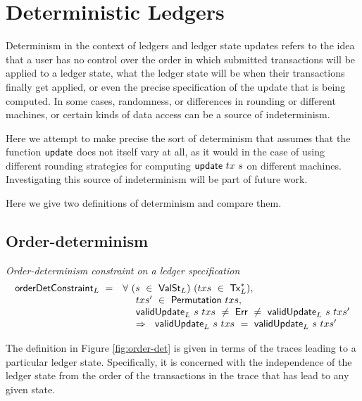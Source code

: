 \section{Deterministic Ledgers}
\label{sec:determinism}

Determinism in the context of ledgers and ledger state updates refers to the
idea that a user has no control over the order in which submitted transactions
will be applied to a ledger state, what the ledger state will be
when their transactions finally get applied, or even the precise specification
of the update that is being computed. In some cases, randomness,
or differences in rounding or different machines, or certain kinds of
data access can be a source of indeterminism.

Here we attempt to make precise the sort of determinism that assumes that the
function $\mathsf{update}$ does not itself vary at all, as it would in the case of using
different rounding strategies for computing $\mathsf{update}~tx~s$ on different machines.
Investigating this source of indeterminism will be part of future work.

Here we give two definitions of determinism and compare them.

\subsection{Order-determinism}
\label{sec:order-det}

\begin{figure*}[htb]
  \emph{Order-determinism constraint on a ledger specification}
  \begin{equation*}
    \begin{array}{l@{~~}l@{~~}ll}
    \fun{orderDetConstraint}_L ~=~ & \forall~(s~\in~\type{ValSt}_L)~(txs~\in~\seqof{\type{Tx}_L}),~\\
    & ~~~~txs'~\in~\fun{Permutation}~txs,~\\
    & ~~~~\fun{validUpdate}_L~s~txs~\neq~\Err~\neq~\fun{validUpdate}_L~s~txs' \\
    & ~~~~\Rightarrow~~\fun{validUpdate}_L~s~txs~=~\fun{validUpdate}_L~s~txs'
    \end{array}
  \end{equation*}
  \caption{Order-determinism}
  \label{fig:order-det}
\end{figure*}

The definition in Figure \ref{fig:order-det} is given in terms of the traces leading
to a particular ledger state. Specifically, it is concerned with the independence of the
ledger state from the order
of the transactions in the trace that has lead to any given state.


